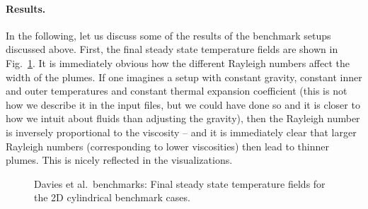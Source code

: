 \documentclass{article}
\begin{document}



\paragraph{Results.}

In the following, let us discuss some of the results of the benchmark setups
discussed above. First, the final steady state temperature fields are shown in
Fig.~\ref{fig:davies-2DcylinderFSS}. It is immediately obvious how the
different Rayleigh numbers affect the width of the plumes. If one imagines a
setup with constant gravity, constant inner and outer temperatures and
constant thermal expansion coefficient (this is not how we describe it in the
input files, but we could have done so and it is closer to how we intuit about
fluids than adjusting the gravity), then the Rayleigh number is inversely
proportional to the viscosity -- and it is immediately clear that larger
Rayleigh numbers (corresponding to lower viscosities) then lead to thinner
plumes. This is nicely reflected in the visualizations.

\begin{figure}[h]
  \hfill
  \hfill
  \hfill
  \hfill
  \caption{Davies et al.~benchmarks: Final steady state temperature fields for
    the 2D cylindrical benchmark cases.}
  \label{fig:davies-2DcylinderFSS}
\end{figure}
\end{document}
